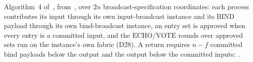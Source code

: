 \begin{definition}
  \label{def:aba-gather-mid}
  \leanok
  Algorithm~4 of~\cite{LeslieBP}, from~\cite{AFW25}, over $2n$ broadcast-specification coordinates: each process contributes its input through its own input-broadcast instance and its $\mathrm{BIND}$ payload through its own bind-broadcast instance, an entry set is approved when every entry is a committed input, and the $\mathrm{ECHO}$/$\mathrm{VOTE}$ rounds over approved sets run on the instance's own fabric (D28).
  A return requires $n{-}f$ committed bind payloads below the output and the output below the committed inputs: .
\end{definition}
